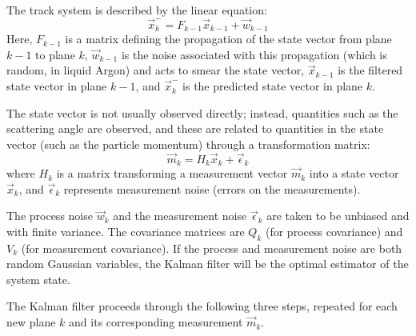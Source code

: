 The track system is described by the linear equation:\citep{Ankowski2006}
\begin{equation}\label{eqn:kalman_track_system}
    \vec{x}_k^{-} = F_{k-1} \vec{x}_{k-1} + \vec{w}_{k-1}
\end{equation}
Here, $F_{k-1}$ is a matrix defining the propagation of the state vector from plane $k-1$ to plane $k$, $\vec{w}_{k-1}$ is the noise associated with this propagation (which is random, in liquid Argon) and acts to smear the state vector, $\vec{x}_{k-1}$ is the filtered state vector in plane $k-1$, and $\vec{x}_k^{-}$ is the predicted state vector in plane $k$.

The state vector is not usually observed directly; instead, quantities such as the scattering angle are observed, and these are related to quantities in the state vector (such as the particle momentum) through a transformation matrix:
\begin{equation}\label{eqn:kalman_measurement_equation}
    \vec{m}_k = H_k \vec{x}_k + \vec{\epsilon}_k
\end{equation}
where $H_k$ is a matrix transforming a measurement vector $\vec{m}_k$ into a state vector $\vec{x}_k$, and $\vec{\epsilon}_k$ represents measurement noise (errors on the measurements).

The process noise $\vec{w}_k$ and the measurement noise $\vec{\epsilon}_k$ are taken to be unbiased and with finite variance. The covariance matrices are $Q_k$ (for process covariance) and $V_k$ (for measurement covariance). If the process and measurement noise are both random Gaussian variables, the Kalman filter will be the optimal estimator of the system state.

The Kalman filter proceeds through the following three steps, repeated for each new plane $k$ and its corresponding measurement $\vec{m}_k$.

